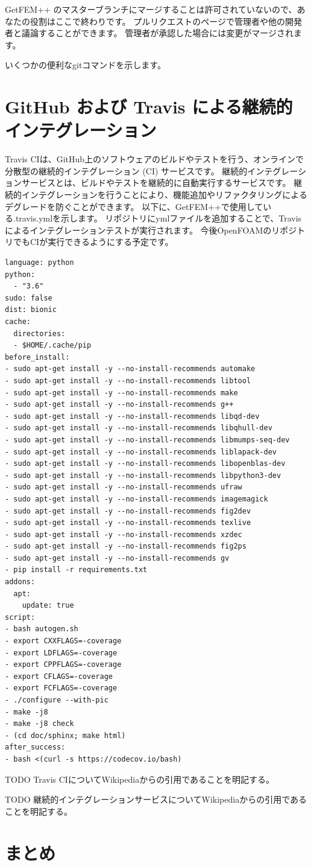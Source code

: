 \documentclass{ltjoc}
\begin{document}
GetFEM++ のマスターブランチにマージすることは許可されていないので、あなたの役割はここで終わりです。
プルリクエストのページで管理者や他の開発者と議論することができます。
管理者が承認した場合には変更がマージされます。

いくつかの便利なgitコマンドを示します。

\begin{shbox}
\end{shbox}

\section{GitHub および Travis による継続的インテグレーション}
Travis CIは、GitHub上のソフトウェアのビルドやテストを行う、オンラインで分散型の継続的インテグレーション (CI) サービスです。
継続的インテグレーションサービスとは、ビルドやテストを継続的に自動実行するサービスです。
継続的インテグレーションを行うことにより、機能追加やリファクタリングによるデグレードを防ぐことができます。
以下に、GetFEM++で使用している.travis.ymlを示します。
リポジトリにymlファイルを追加することで、Travisによるインテグレーションテストが実行されます。
今後OpenFOAMのリポジトリでもCIが実行できるようにする予定です。
\begin{lstlisting}
language: python
python:
  - "3.6"
sudo: false
dist: bionic
cache:
  directories:
  - $HOME/.cache/pip
before_install:
- sudo apt-get install -y --no-install-recommends automake
- sudo apt-get install -y --no-install-recommends libtool
- sudo apt-get install -y --no-install-recommends make
- sudo apt-get install -y --no-install-recommends g++
- sudo apt-get install -y --no-install-recommends libqd-dev
- sudo apt-get install -y --no-install-recommends libqhull-dev
- sudo apt-get install -y --no-install-recommends libmumps-seq-dev
- sudo apt-get install -y --no-install-recommends liblapack-dev
- sudo apt-get install -y --no-install-recommends libopenblas-dev
- sudo apt-get install -y --no-install-recommends libpython3-dev
- sudo apt-get install -y --no-install-recommends ufraw
- sudo apt-get install -y --no-install-recommends imagemagick
- sudo apt-get install -y --no-install-recommends fig2dev
- sudo apt-get install -y --no-install-recommends texlive
- sudo apt-get install -y --no-install-recommends xzdec
- sudo apt-get install -y --no-install-recommends fig2ps
- sudo apt-get install -y --no-install-recommends gv
- pip install -r requirements.txt
addons:
  apt:
    update: true
script:
- bash autogen.sh
- export CXXFLAGS=-coverage
- export LDFLAGS=-coverage
- export CPPFLAGS=-coverage
- export CFLAGS=-coverage
- export FCFLAGS=-coverage
- ./configure --with-pic
- make -j8
- make -j8 check
- (cd doc/sphinx; make html)
after_success:
- bash <(curl -s https://codecov.io/bash)
\end{lstlisting}

TODO Travis CIについてWikipediaからの引用であることを明記する。

TODO 継続的インテグレーションサービスについてWikipediaからの引用であることを明記する。
\section{まとめ}


\end{document}

